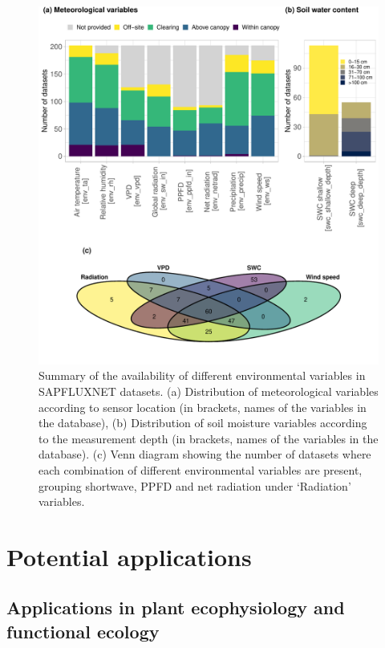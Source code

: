 \documentclass[11pt,twoside]{reedthesis}
\begin{document}
\setlength{\abovecaptionskip}{0pt}
\begin{figure}[hbt!]

{\centering \includegraphics[width=1\linewidth]{figure/CH3/Figure8} 

}

\caption[Summary of the availability of different environmental variables in SAPFLUXNET datasets.]{Summary of the availability of different environmental variables in SAPFLUXNET datasets. (a) Distribution of meteorological variables according to sensor location (in brackets, names of the variables in the database), (b) Distribution of soil moisture variables according to the measurement depth (in brackets, names of the variables in the database). (c) Venn diagram showing the number of datasets where each combination of different environmental variables are present, grouping shortwave, PPFD and net radiation under ‘Radiation’ variables.}\label{fig:Ch2plot8}
\end{figure}
\section{Potential applications}\label{potential-applications}

\subsection{Applications in plant ecophysiology and functional
ecology}\label{applications-in-plant-ecophysiology-and-functional-ecology}
\end{document}

